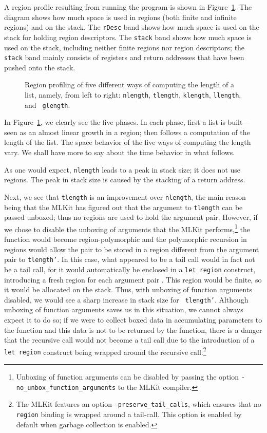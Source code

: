 \documentclass[12pt]{book}
\begin{document}
A region profile resulting from running the program is shown in
Figure~\ref{length.region.fig}.  The diagram shows how much space is
used in regions (both finite and infinite regions) and on the stack.
The
%
{\tt rDesc} band shows how much space is used on the stack for holding
region descriptors. The
%
{\tt stack} band shows how much space is used on the stack, including
neither finite regions nor region descriptors; the {\tt stack} band
mainly consists of registers and return addresses that have been
pushed onto the stack.
\begin{figure}
\caption{Region profiling of five different
  ways of computing the length of a list, namely, from left to right:
  {\tt nlength}, {\tt tlength}, {\tt klength}, {\tt llength}, and {\tt
    glength}.}
\label{length.region.fig}
\end{figure}

In Figure~\ref{length.region.fig}, we clearly see the five phases.  In
each phase, first a list is built---seen as an almost linear growth in
a region; then follows a computation of the length of the list.  The
space behavior of the five ways of computing the length vary. We shall
have more to say about the time behavior in what follows.

As one would expect, {\tt nlength} leads to a peak in stack size; it
does not use regions. The peak in stack size is caused by the stacking
of a return address.

Next, we see that {\tt tlength} is an improvement over {\tt nlength},
the main reason being that the MLKit has figured out that the argument
to {\tt tlength} can be passed unboxed; thus no regions are used to
hold the argument pair. However, if we chose to disable the unboxing
of arguments that the MLKit performs,\footnote{Unboxing of function
  arguments can be disabled by passing the option
  \texttt{-no\_unbox\_function\_arguments} to the MLKit compiler.} the
function would become region-polymorphic and the polymorphic recursion
in regions would allow the pair  to be stored in a
region different from the argument pair to {\tt tlength'}. In this
case, what appeared to be a tail call would in fact not be a tail
call, for it would automatically be enclosed in a {\tt let region}
construct, introducing a fresh region for each argument pair
.  This region would be finite, so it would be
allocated on the stack.  Thus, with unboxing of function arguments
disabled, we would see a sharp increase in stack size for {\tt
  tlength'}. Although unboxing of function arguments saves us in this
situation, we cannot always expect it to do so; if we were to collect
boxed data in accumulating parameters to the function and this data is
not to be returned by the function, there is a danger that the
recursive call would not become a tail call due to the introduction of
a {\tt let region} construct being wrapped around the recursive
call.\footnote{The MLKit features an option
  \texttt{--preserve\_tail\_calls}, which ensures that no
  \texttt{region} binding is wrapped around a tail-call. This
  option is enabled by default when garbage collection is enabled.}
\end{document}
